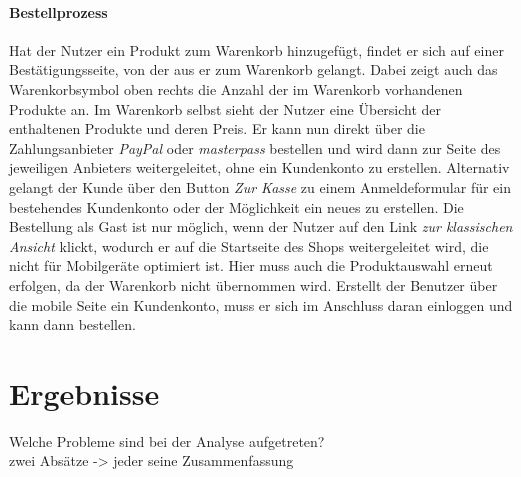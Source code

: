 \documentclass[	12pt, 
				a4paper, 
				BCOR=10mm, %
				DIV=12, 
				parskip=half, %
				headings=small, %
				twoside, %
				ngerman,
				bibliography=totoc,index=totoc, listof=totoc,
				numbers=noendperiod
				]{scrbook} %
\theoremstyle{plain}%
\theoremstyle{definition}
\theoremstyle{remark}
\begin{document}
\paragraph{Bestellprozess} Hat der Nutzer ein Produkt zum Warenkorb hinzugefügt, findet er sich auf einer Bestätigungsseite, von der aus er zum Warenkorb gelangt. Dabei zeigt auch das Warenkorbsymbol oben rechts die Anzahl der im Warenkorb vorhandenen Produkte an. Im Warenkorb selbst sieht der Nutzer eine Übersicht der enthaltenen Produkte und deren Preis. Er kann nun direkt über die Zahlungsanbieter \textit{PayPal} oder \textit{masterpass} bestellen und wird dann zur Seite des jeweiligen Anbieters weitergeleitet, ohne ein Kundenkonto zu erstellen. Alternativ gelangt der Kunde über den Button \textit{Zur Kasse} zu einem Anmeldeformular für ein bestehendes Kundenkonto oder der Möglichkeit ein neues zu erstellen. Die Bestellung als Gast ist nur möglich, wenn der Nutzer auf den Link \textit{zur klassischen Ansicht} klickt, wodurch er auf die Startseite des Shops weitergeleitet wird, die nicht für Mobilgeräte optimiert ist. Hier muss auch die Produktauswahl erneut erfolgen, da der Warenkorb nicht übernommen wird. Erstellt der Benutzer über die mobile Seite ein Kundenkonto, muss er sich im Anschluss daran einloggen und kann dann bestellen.

\section{Ergebnisse}
Welche Probleme sind bei der Analyse aufgetreten?\\
zwei Absätze -> jeder seine Zusammenfassung
\end{document}
